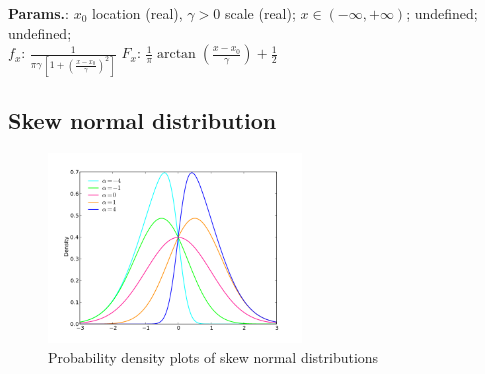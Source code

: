     {\color{darkblue} \textbf{Params.}:} {$x_0\!$ location (real),  $\gamma > 0$ scale (real)}; {$\displaystyle x \in (-\infty, +\infty)\!$}; {undefined}; {undefined};\hspace{0.5cm}\\{\color{darkblue} \textbf{$f_x$}:} {$\frac{1}{\pi\gamma\,\left[1 + \left(\frac{x-x_0}{\gamma}\right)^2\right]}\!$}{\color{darkblue} \textbf{$F_x$}:} {$\frac{1}{\pi} \arctan\left(\frac{x-x_0}{\gamma}\right)+\frac{1}{2}\!$}



    
        
\subsection{Skew normal distribution}


    \begin{figure}[H]
        \centering
        \includegraphics[width=0.6\textwidth]{images/Skew normal densities.png}
        \caption{Probability density plots of skew normal distributions}
    \end{figure}




